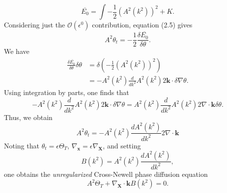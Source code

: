 \documentclass[12pt]{article}
\numberwithin{equation}{section}
\begin{document}
\begin{equation}
\overline{E_0} = \int - \frac{1}{2}\left( A^2(k^2) \right)^2 + K.
\end{equation}
Considering just the $\mathcal{O}(\epsilon^0)$ contribution, equation (2.5) gives
\begin{equation}
A^2 \theta_t = -\frac{1}{2}\frac{\delta \overline{E_0}}{\delta \theta}.
\end{equation}
We have
\begin{align*}
\frac{\delta \overline{E_0}}{\delta \theta}\delta \theta &= \delta\left( -\frac{1}{2}(A^2(k^2))^2\right)\\
                                                         &= -A^2(k^2)\frac{d}{dk^2}A^2(k^2)2\bm{k}\cdot \delta \nabla \theta.
\end{align*}
Using integration by parts, one finds that
\begin{equation*}
-A^2(k^2)\frac{d}{dk^2}A^2(k^2)2\bm{k}\cdot \delta \nabla \theta = A^2(k^2)\frac{d}{dk^2}A^2(k^2)2\nabla \cdot \bm{k}\delta \theta.
\end{equation*}
Thus, we obtain
\begin{equation*}
A^2 \theta_t = -A^2(k^2)\frac{dA^2(k^2)}{dk^2}2\nabla\cdot\bm{k}
\end{equation*}
Noting that $\theta_t = \epsilon \Theta_T$, $\nabla_{\bm{x}}=\epsilon\nabla_{\bm{X}}$, and setting
\begin{equation}
B(k^2) = A^2(k^2)\frac{dA^2(k^2)}{dk^2},
\end{equation}
one obtains the \emph{unregularized} Cross-Newell phase diffusion equation
\begin{equation}
A^2\Theta_T + \nabla_{\bm{X}}\cdot \bm{k}B(k^2) = 0.
\end{equation}
\end{document}
